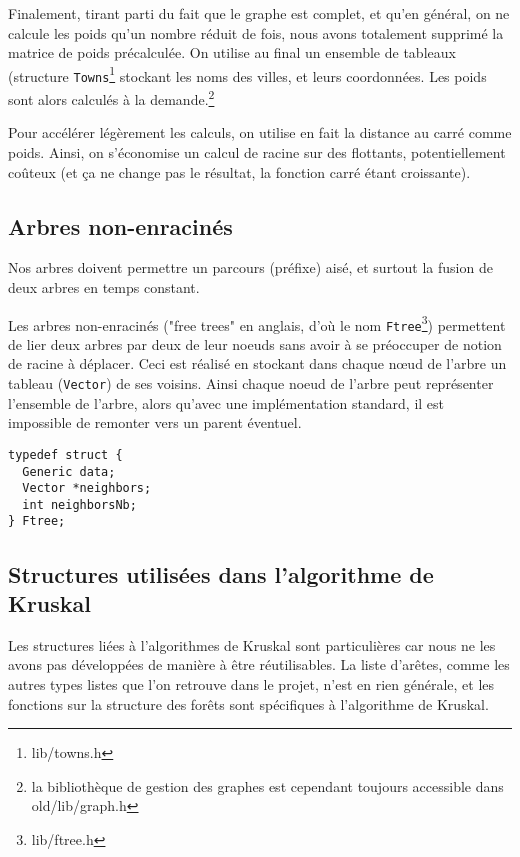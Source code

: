 \documentclass[a4paper]{article}
\begin{document}
Finalement, tirant parti du fait que le graphe est complet, et qu'en général, on ne calcule les poids qu'un nombre réduit de fois, nous avons totalement supprimé la matrice de poids précalculée. On utilise au final un ensemble de tableaux (structure \texttt{Towns}\footnote{lib/towns.h} stockant les noms des villes, et leurs coordonnées. Les poids sont alors calculés à la demande.\footnote{la bibliothèque de gestion des graphes est cependant toujours accessible dans old/lib/graph.h}

Pour accélérer légèrement les calculs, on utilise en fait la distance au carré comme poids. Ainsi, on s'économise un calcul de racine sur des flottants, potentiellement coûteux (et ça ne change pas le résultat, la fonction carré étant croissante).

\subsection{Arbres non-enracinés}

Nos arbres doivent permettre un parcours (préfixe) aisé, et surtout la fusion de deux arbres en temps constant.

Les arbres non-enracinés ("free trees" en anglais, d'où le nom \texttt{Ftree}\footnote{lib/ftree.h}) permettent de lier deux arbres par deux de leur noeuds sans avoir à se préoccuper de notion de racine à déplacer. Ceci est réalisé en stockant dans chaque nœud de l'arbre un tableau (\texttt{Vector}) de ses voisins. Ainsi chaque noeud de l'arbre peut représenter l'ensemble de l'arbre, alors qu'avec une implémentation standard, il est impossible de remonter vers un parent éventuel.

\begin{verbatim}
typedef struct {
  Generic data;
  Vector *neighbors;
  int neighborsNb;
} Ftree;
\end{verbatim}

\subsection{Structures utilisées dans l'algorithme de {\sc Kruskal}}

Les structures liées à l'algorithmes de {\sc Kruskal} sont particulières car nous ne les avons pas développées de manière à être réutilisables. La liste d'arêtes, comme les autres types listes que l'on retrouve dans le projet, n'est en rien générale, et les fonctions sur la structure des forêts sont spécifiques à l'algorithme de {\sc Kruskal}.
\end{document}
